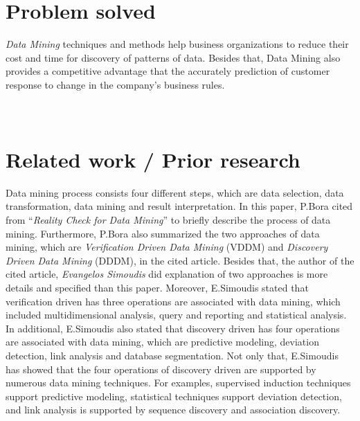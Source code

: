 \documentclass[a4paper,12pt]{article}
\begin{document}
\newpage
\setcounter{page}{1}
\section{Problem solved} 
\hspace*{1cm} \textit{Data Mining} techniques and methods help business organizations to reduce their cost and time for discovery of patterns of data. Besides that, Data Mining also provides a competitive advantage that the accurately prediction of customer response to change in the company’s business rules.
\\ \\ \\   
\section{Related work / Prior research}
\hspace{1cm}Data mining process consists four different steps, which are data selection, data transformation, data mining and result interpretation. In this paper, P.Bora cited from “\textit{Reality Check for Data Mining}” to briefly describe the process of data mining. Furthermore, P.Bora also summarized the two approaches of data mining, which are \textit{Verification Driven Data Mining} (VDDM) and \textit{Discovery Driven Data Mining} (DDDM), in the cited article. Besides that, the author of the cited article, \textit{Evangelos Simoudis} did explanation of two approaches is more details and specified than this paper. Moreover, E.Simoudis stated that verification driven has three operations are associated with data mining, which included multidimensional analysis, query and reporting and statistical analysis. In additional, E.Simoudis also stated that discovery driven has four operations are associated with data mining, which are predictive modeling, deviation detection, link analysis and database segmentation. Not only that, E.Simoudis has showed that the four operations of discovery driven are supported by numerous data mining techniques. For examples, supervised induction techniques support predictive modeling, statistical techniques support deviation detection, and link analysis is supported by sequence discovery and association discovery. ~\cite{SimoudisE1996}
\newpage
\end{document}
